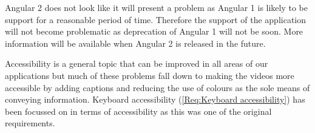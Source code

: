 Angular 2 does not look like it will present a problem as Angular 1 is likely to be support for a reasonable period of time. Therefore the support of the application will not become problematic as deprecation of Angular 1 will not be soon. More information will be available when Angular 2 is released in the future.

Accessibility is a general topic that can be improved in all areas of our applications but much of these problems fall down to making the videos more accessible by adding captions and reducing the use of colours as the sole means of conveying information. Keyboard accessibility (\cref{Req:Keyboard accessibility}) has been focussed on in terms of accessibility as this was one of the original requirements.
